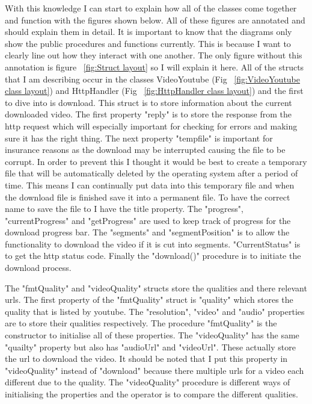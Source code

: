\documentclass{article}
\begin{document}
With this knowledge I can start to explain how all of the classes come together and
function with the figures shown below. All of these figures are annotated and should
explain them in detail. It is important to know that the diagrams only show the
public procedures and functions currently. This is because I want to clearly line
out how they interact with one another. The only figure without this annotation is
figure ~\ref{fig:Struct layout} so I will explain it here. All of the structs that I
am describing occur in the classes VideoYoutube (Fig ~\ref{fig:VideoYoutube class layout})
and HttpHandler (Fig ~\ref{fig:HttpHandler class layout}) and the first to dive into is
download. This struct is to store information about the current downloaded video. The
first property "reply" is to store the response from the http request which will
especially important for checking for errors and making sure it has the right thing. The
next property "tempfile" is important for insurance reasons as the download may be
interrupted causing the file to be corrupt. In order to prevent this I thought it would
be best to create a temporary file that will be automatically deleted by the operating
system after a period of time. This means I can continually put data into this temporary
file and when the download file is finished save it into a permanent file. To have the
correct name to save the file to I have the title property. The "progress", 
"currentProgress" and "getProgress" are used to keep track of progress for the download
progress bar. The "segments" and "segmentPosition" is to allow the functionality to
download the video if it is cut into segments. "CurrentStatus" is to get the http status
code. Finally the "download()" procedure is to initiate the download process. 

The "fmtQuality" and "videoQuality" structs store the qualities and there relevant
urls. The first property of the "fmtQuality" struct is "quality" which stores the quality
that is listed by youtube. The "resolution", "video" and "audio" properties are to store
their qualities respectively. The procedure "fmtQuality" is the constructor to initialise 
all of these properties. The "videoQuality" has the same "quailty" property but also has
"audioUrl" and "videoUrl". These actually store the url to download the video. It should be 
noted that I put this property in "videoQuality" instead of "download" because there 
multiple urls for a video each different due to the quality. The "videoQuality" procedure
is different ways of initialising the properties and the operator is to compare the 
different qualities.
\end{document}
